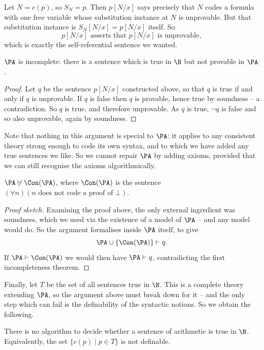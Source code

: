 Let $N = c(p)$, so $S_N = p$. Then $p[N/x]$ says precisely that $N$ codes a formula with one free variable whose substitution instance at $N$ is unprovable. But that substitution instance is $S_N[N/x] = p[N/x]$ itself. So
$$p[N/x] \text{ asserts that } p[N/x] \text{ is unprovable},$$
which is exactly the self-referential sentence we wanted.

\begin{theorem}
  $\PA$ is incomplete: there is a sentence which is true in $\N$ but not provable in $\PA$.
\end{theorem}
\begin{proof}
  Let $q$ be the sentence $p[N/x]$ constructed above, so that $q$ is true if and only if $q$ is unprovable. If $q$ is false then $q$ is provable, hence true by soundness -- a contradiction. So $q$ is true, and therefore unprovable. As $q$ is true, $\lnot q$ is false and so also unprovable, again by soundness.
\end{proof}

Note that nothing in this argument is special to $\PA$: it applies to any consistent theory strong enough to code its own syntax, and to which we have added any true sentences we like. So we cannot repair $\PA$ by adding axioms, provided that we can still recognise the axioms algorithmically.

\begin{theorem}
  $\PA \not\vdash \Con(\PA)$, where $\Con(\PA)$ is the sentence $(\forall n)(n \text{ does not code a proof of } \bot)$.
\end{theorem}
\begin{proof}[Proof sketch]
  Examining the proof above, the only external ingredient was soundness, which we used via the existence of a model of $\PA$ -- and any model would do. So the argument formalises inside $\PA$ itself, to give
  $$\PA \cup \{\Con(\PA)\} \vdash q.$$
  If $\PA \vdash \Con(\PA)$ we would then have $\PA \vdash q$, contradicting the first incompleteness theorem.
\end{proof}

Finally, let $T$ be the set of all sentences true in $\N$. This is a complete theory extending $\PA$, so the argument above must break down for it -- and the only step which can fail is the definability of the syntactic notions. So we obtain the following.

\begin{theorem}
  There is no algorithm to decide whether a sentence of arithmetic is true in $\N$. Equivalently, the set $\{c(p) \mid p \in T\}$ is not definable.
\end{theorem}


